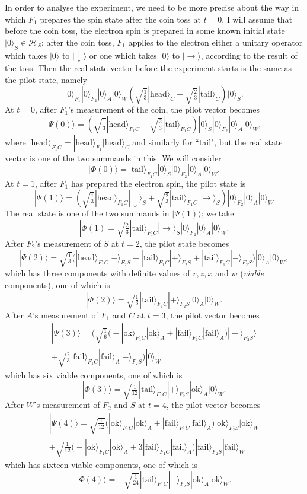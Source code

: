 \documentclass[12pt,reqno]{article}
\newcommand{\head}{\text{head}}
\newcommand{\tail}{\text{tail}}
\newcommand{\ok}{\text{ok}}
\newcommand{\fail}{\text{fail}}
\renewcommand{\(}{\left(}
\renewcommand{\)}{\right)}
\renewcommand{\.}{\centerdot}
\newcommand{\1}{\mathbf{1}}
\newcommand{\<}{\langle}
\renewcommand{\>}{\rangle}
\newcommand{\third}{\tfrac{1}{3}}
\renewcommand{\H}{\mathcal{H}}
\theoremstyle{definition}
\theoremstyle{remark}
\numberwithin{equation}{section}
\begin{document}
  In order to analyse the experiment, we need to be more precise about the way in which $F_1$ prepares the spin state after the coin toss at $t = 0$. I will assume that before the coin toss, the electron spin is prepared in some known initial state $|0\>_S\in\H_S$; after the coin toss, $F_1$ applies to the electron either a unitary operator which takes $|0\>$ to $|\downarrow\>$ or one which takes $|0\>$ to $|\rightarrow\>$, according to the result of the toss. Then the real state vector before the experiment starts is the same as the pilot state, namely
\[
 |0\>_{F_1}|0\>_{F_2}|0\>_A|0\>_W\(\sqrt{\third}|\head\>_C + \sqrt{\tfrac{2}{3}}|\tail\>_C\)|0\>_S. 
\]
  	At $t=0$, after $F_1$'s measurement of the coin, the pilot vector becomes 
\[
|\Psi(0)\> = \left(\sqrt{\third}|\head\>_{F_1C} + \sqrt{\tfrac{2}{3}}|\tail\>_{F_1C}\right)|0\>_S|0\>_{F_2}|0\>_A|0\>_W,
\]
where $|\head\>_{F_1C} = |\head\>_{F_1}|\head\>_C$ and similarly for ``tail",
but the real state vector is one of the two summands in this. We will consider
\[
|\Phi(0)\> = |\tail\>_{F_1C}|0\>_S|0\>_{F_2}|0\>_A|0\>_W.
\]
At $t =1$, after $F_1$ has prepared the electron spin, the pilot state is
\[
|\Psi(1)\> = \left(\sqrt{\third}|\head\>_{F_1C}|\downarrow\>_S + \sqrt{\tfrac{2}{3}}|\tail\>_{F_1C}|\rightarrow\>_S\right)|0\>_{F_2}|0\>_A|0\>_W
\]
The real state is one of the two summands in $|\Psi(1)\>$; we take
\[
|\Phi(1) = \sqrt{\tfrac{2}{3}}|\tail\>_{F_1C}|\rightarrow\>_S|0\>_{F_2}|0\>_A|0\>_W.
\]
After $F_2$'s measurement of $S$ at $t = 2$, the pilot state becomes
\[
|\Psi(2)\> = \sqrt{\tfrac{1}{3}}\bigg(|\head\>_{F_1C}|-\>_{F_2S} + |\tail\>_{F_1C}|+\>_{F_2S} + 
|\tail\>_{F_1C}|-\>_{F_2S}\bigg)|0\>_A|0\>_W,
\]
which has three components with definite values of $r, z, x$ and $w$ (\emph{viable} components), one of which is
\[
|\Phi(2)\> = \sqrt{\tfrac{1}{3}}|\tail\>_{F_1C}|+\>_{F_2S}|0\>_A|0\>_W.
\]
After $A$'s measurement of $F_1$ and $C$ at $t = 3$, the pilot vector becomes
\begin{multline*}
|\Psi(3)\> = \bigg(\sqrt{\tfrac{1}{6}}\Big( - |\ok\>_{F_1C}|\ok\>_A + |\fail\>_{F_1C}|\fail\>_A\Big)|+\>_{F_2S}\>\\
+ \sqrt{\tfrac{2}{3}}|\fail\>_{F_1C}|\fail\>_A|-\>_{F_2S}\bigg)|0\>_W
\end{multline*}
which has six viable components, one of which is
\[
|\Phi(3)\> = \sqrt{\tfrac{1}{12}}|\tail\>_{F_1C}|+\>_{F_2S}|\ok\>_A|0\>_W.
\]
After $W$'s measurement of $F_2$ and $S$ at $t = 4$, the pilot vector becomes
\begin{multline*}
|\Psi(4)\> = \sqrt{\tfrac{1}{12}}\Big(|\ok\>_{F_1C}|\ok\>_A + |\fail\>_{F_1C}|\fail\>_A\Big)|\ok\>_{F_2S}|\ok\>_W\\
+ \sqrt{\tfrac{1}{12}}\Big(- |\ok\>_{F_1C}|\ok\>_A + 3|\fail\>_{F_1C}|\fail\>_A\Big)|\fail\>_{F_2S}|\fail\>_W
\end{multline*}
which has sixteen viable components, one of which is
\[
|\Phi(4)\> = -\sqrt{\tfrac{1}{24}}|\tail\>_{F_1C}|-\>_{F_2S}|\ok\>_A|\ok\>_W.
\]
\end{document}
